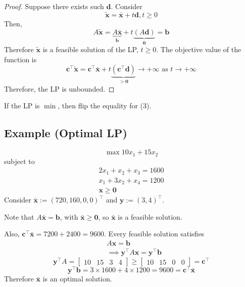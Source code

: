 \begin{proof}
    Suppose there exists such $\bm{d}$. Consider
    \[\tilde{\bm{x}}=\bar{\bm{x}}+t\bm{d}, t\ge 0\]
Then,
\[A\tilde{\bm{x}}=
\underbrace{A\bar{\bm{x}}}_{\bm{b}}+
t\underbrace{(A\bm{d})}_{\bm{0}}=\bm{b}\]
Therefore $\tilde{\bm{x}}$ is a feasible solution of the LP, $t\ge 0$.
The objective value of the function is
\[\bm{c}^\top \tilde{\bm{x}}=\bm{c}^\top \bar{\bm{x}}+t
\underbrace{(\bm{c}^\top \bm{d})}_{>\bm{0}}\rightarrow +\infty\text{ as }t\rightarrow+\infty\]
Therefore, the LP is unbounded.
\end{proof}
\begin{remark}
    If the LP is $\min$, then flip the equality for (3).
\end{remark}

\subsection{Example (Optimal LP)}
\[\max 10x_1+15x_2\]
subject to
\begin{align*}
    2x_1+x_2+x_3=1600\\
    x_1+3x_2+x_4=1200\\
    \bm{x}\ge \bm{0}
\end{align*}
Consider $\bar{\bm{x}}:=(720,160,0,0)^\top$ and $\bm{y}:=(3,4)^\top$.

Note that
$A\bar{\bm{x}}=\bm{b}$, with $\bar{\bm{x}}\ge \bm{0}$, 
so $\bar{\bm{x}}$ is a feasible solution.


Also, $\bm{c}^\top \bm{\bar{x}}=7200+2400=9600$.
Every feasible solution satisfies
\begin{align*}
    &A\bm{x}=\bm{b}\\
    &\implies \bm{y}^\top A\bm{x}=\bm{y}^\top \bm{b}
\end{align*}
\[\bm{y}^\top A=
\begin{bmatrix}
    10 & 15 & 3 & 4
\end{bmatrix}
\ge
\begin{bmatrix}
    10 & 15 & 0 & 0
\end{bmatrix}=\bm{c}^\top \]
\[\bm{y}^\top \bm{b}
=3\times 1600+4\times 1200=9600
=\bm{c}^\top \bm{\bar{x}}\]
Therefore $\bar{\bm{x}}$ is an optimal solution.
